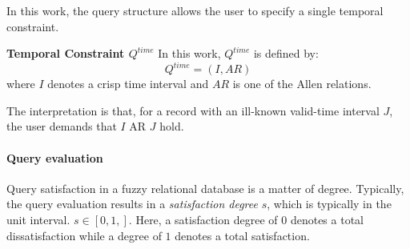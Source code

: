 In this work, the query structure allows the user to specify a single temporal constraint.

\begin{svgraybox}
\vspace{-10pt}
\begin{definition}
\textbf{Temporal Constraint $Q^{time}$}
In this work, $Q^{time}$ is defined by:
\begin{equation}
Q^{time} = \left( I,AR \right)
\end{equation}
where $I$ denotes a crisp time interval and $AR$ is one of the Allen relations.
\end{definition}
\vspace{-10pt}
\end{svgraybox}

The interpretation is that, for a record with an ill-known valid-time interval $J$, the user demands that $I$ AR $J$ hold.

\paragraph{\textbf{Query evaluation}}
\label{subsubsec:query-evaluation}
Query satisfaction in a fuzzy relational database is a matter of degree. Typically, the query evaluation results in a \emph{satisfaction degree} $s$, which is typically in the unit interval. $s \in \left[ 0,1,\right]$. Here, a satisfaction degree of $0$ denotes a total dissatisfaction while a degree of $1$ denotes a total satisfaction.



